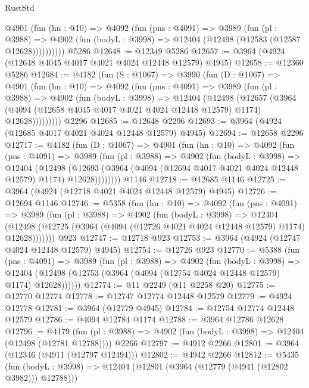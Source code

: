 \begin{lexlean}{RustStd}
\begin{coremodule}
        @4901
          (fun (hn : @10) =>
          @4092
            (fun (pns : @4091) =>
            @3989
              (fun (pl : @3988) =>
              @4902 (fun (bodyL : @3998) => @12404 (@12498 (@12583 (@12587 @12628))))))))))
    @5286
@12648 := @12349 @5286
@12657 := @3964 (@4924 (@12648 @4045 @4017 @4021 @4024 @12448 @12579) @4945)
@12658 := @12360 @5286
@12684 := @4182
    (fun (S : @1067) =>
    @3990
      (fun (D : @1067) =>
      @4901
        (fun (hn : @10) =>
        @4092
          (fun (pns : @4091) =>
          @3989
            (fun (pl : @3988) =>
            @4902
              (fun (bodyL : @3998) =>
              @12404
                (@12498
                  (@12657
                    (@3964
                      (@4094 (@12658 @4045 @4017 @4021 @4024 @12448 @12579) @1174)
                      @12628)))))))))
    @2296
@12685 := @12648 @2296
@12693 := @3964 (@4924 (@12685 @4017 @4021 @4024 @12448 @12579) @4945)
@12694 := @12658 @2296
@12717 := @4182
    (fun (D : @1067) =>
    @4901
      (fun (hn : @10) =>
      @4092
        (fun (pns : @4091) =>
        @3989
          (fun (pl : @3988) =>
          @4902
            (fun (bodyL : @3998) =>
            @12404
              (@12498
                (@12693 (@3964 (@4094 (@12694 @4017 @4021 @4024 @12448 @12579) @1174) @12628))))))))
    @1146
@12718 := @12685 @1146
@12725 := @3964 (@4924 (@12718 @4021 @4024 @12448 @12579) @4945)
@12726 := @12694 @1146
@12746 := @5358
    (fun (hn : @10) =>
    @4092
      (fun (pns : @4091) =>
      @3989
        (fun (pl : @3988) =>
        @4902
          (fun (bodyL : @3998) =>
          @12404
            (@12498 (@12725 (@3964 (@4094 (@12726 @4021 @4024 @12448 @12579) @1174) @12628)))))))
    @923
@12747 := @12718 @923
@12753 := @3964 (@4924 (@12747 @4024 @12448 @12579) @4945)
@12754 := @12726 @923
@12770 := @5388
    (fun (pns : @4091) =>
    @3989
      (fun (pl : @3988) =>
      @4902
        (fun (bodyL : @3998) =>
        @12404 (@12498 (@12753 (@3964 (@4094 (@12754 @4024 @12448 @12579) @1174) @12628))))))
@12774 := @11 @2249 (@11 @2258 @20)
@12775 := @12770 @12774
@12778 := @12747 @12774 @12448 @12579
@12779 := @4924 @12778
@12781 := @3964 (@12779 @4945)
@12784 := @12754 @12774 @12448 @12579
@12786 := @4094 @12784 @1174
@12788 := @3964 @12786 @12628
@12796 := @4179
    (fun (pl : @3988) => @4902 (fun (bodyL : @3998) => @12404 (@12498 (@12781 @12788))))
    @2266
@12797 := @4912 @2266
@12801 := @3964 (@12346 (@4911 (@12797 @12494)))
@12802 := @4942 @2266
@12812 := @5435
    (fun (bodyL : @3998) => @12404 (@12801 (@3964 (@12779 (@4941 (@12802 @3982))) @12788)))

\end{coremodule}
\end{lexlean}
